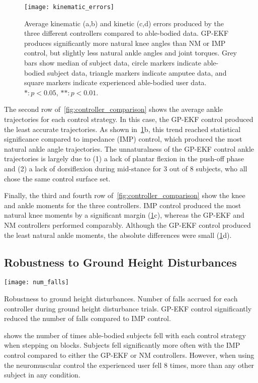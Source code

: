 \begin{figure}[t]
   \centering \texttt{[image: kinematic\_errors]}
   \caption{Average kinematic (a,b) and kinetic (c,d) errors produced by the
   three different controllers compared to able-bodied data. GP-EKF produces
   significantly more natural knee angles than NM or IMP control, but slightly
   less natural ankle angles and joint torques. Grey bars show median of subject
   data, circle markers indicate able-bodied subject data, triangle markers
   indicate amputee data, and square markers indicate experienced able-bodied
   user data. $*: p < 0.05$, $**: p < 0.01$.}\label{fig:kinematic_errors}
\end{figure}
The second row of~\cref{fig:controller_comparison} shows the average ankle
trajectories for each control strategy. In this case, the GP-EKF control
produced the least accurate trajectories. As shown
in~\cref{fig:kinematic_errors}b, this trend reached statistical significance
compared to impedance (IMP) control, which produced the most natural ankle angle
trajectories. The unnaturalness of the GP-EKF control ankle trajectories is
largely due to (1) a lack of plantar flexion in the push-off phase and (2) a
lack of dorsiflexion during mid-stance for 3 out of 8 subjects, who all chose
the same control surface set.

Finally, the third and fourth row of~\cref{fig:controller_comparison} show the
knee and ankle moments for the three controllers. IMP control produced the most
natural knee moments by a significant margin (\cref{fig:kinematic_errors}c),
whereas the GP-EKF and NM controllers performed comparably. Although the GP-EKF
control produced the least natural ankle moments, the absolute differences were
small (\cref{fig:kinematic_errors}d).
\vspace*{\fill}%
\pagebreak
\subsection{Robustness to Ground Height Disturbances}
\begin{marginfigure}[-1in]
    \centering
    \texttt{[image: num\_falls]} 
    \caption{Robustness to ground height disturbances. Number of falls accrued
    for each controller during ground height disturbance trials. GP-EKF control
    significantly reduced the number of falls compared to IMP
    control.}\label{fig:num_block_falls}
\end{marginfigure}

 shows the number of times able-bodied subjects fell
with each control strategy when stepping on blocks. Subjects fell significantly
more often with the IMP control compared to either the GP-EKF or NM controllers.
However, when using the neuromuscular control the experienced user fell 8 times,
more than any other subject in any condition.

